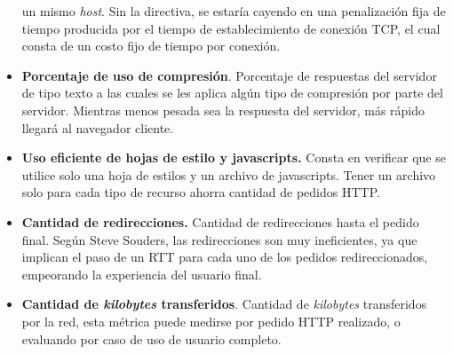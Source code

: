 \begin{itemize}
	un mismo \emph{host}. Sin la directiva, se estaría cayendo en una penalización fija de tiempo producida por el tiempo de establecimiento de conexión TCP, el cual consta de un
	costo fijo de tiempo por conexión.
	\item
	\textbf{Porcentaje de uso de compresión}. Porcentaje de respuestas del servidor de tipo texto a las cuales se les aplica algún tipo de compresión por parte del servidor. Mientras
	menos pesada sea la respuesta del servidor, más rápido llegará al navegador cliente.
	\item
	\textbf{Uso eficiente de hojas de estilo y javascripts.} Consta en verificar que se utilice solo una hoja de estilos y un archivo de javascripts. Tener un archivo solo para cada tipo de
	recurso ahorra cantidad de pedidos HTTP.
	\item
	\textbf{Cantidad de redirecciones.} Cantidad de redirecciones hasta el pedido final. Según Steve Souders, las redirecciones son muy ineficientes, ya que implican el paso de un RTT
	para cada uno de los pedidos redireccionados, empeorando la experiencia del usuario final.
	\item
	\textbf{Cantidad de \emph{kilobytes} transferidos}. Cantidad de \emph{kilobytes} transferidos por la red, esta métrica puede medirse por pedido HTTP realizado, o evaluando
	por caso de uso de usuario completo.
\end{itemize}
